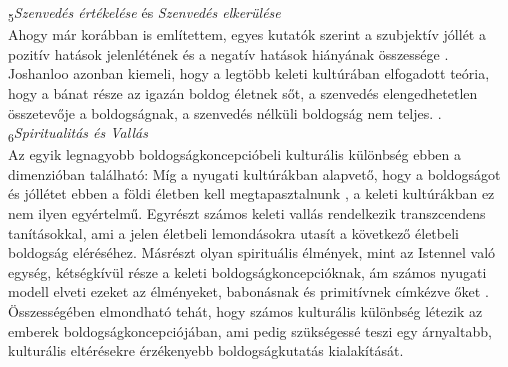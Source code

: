 \textsubscript{5}\textit{Szenvedés értékelése} és \textit{Szenvedés elkerülése}\\
Ahogy már korábban is említettem, egyes kutatók szerint a szubjektív jóllét a pozitív hatások jelenlétének és a negatív hatások hiányának összessége \parencite{diener_suh_lucas_smith_1999}. Joshanloo azonban kiemeli, hogy a legtöbb keleti kultúrában elfogadott teória, hogy a bánat része az igazán boldog életnek sőt, a szenvedés elengedhetetlen összetevője a boldogságnak, a szenvedés nélküli boldogság nem teljes. \parencite{joshanloo_2013_eastern}.\\
\textsubscript{6}\textit{Spiritualitás és Vallás}\\
Az egyik legnagyobb boldogságkoncepcióbeli kulturális különbség ebben a dimenzi\-óban található: Míg a nyugati kultúrákban alapvető, hogy a boldogságot és jóllétet ebben a földi életben kell megtapasztalnunk \parencite{joshanloo_2013_eastern}, a keleti kultúrákban ez nem ilyen egyértelmű. Egyrészt számos keleti vallás rendelkezik transzcendens tanításokkal, ami a jelen életbeli lemondásokra utasít a következő életbeli boldogság eléréséhez. Másrészt olyan spirituális élmények, mint az Istennel való egység, kétség\-kívül része a keleti boldogságkoncepcióknak, ám számos nyugati modell elveti ezeket az élményeket, babonásnak és primitívnek címkézve őket \parencite{joshanloo_2013_eastern}.\\
Összességében elmondható tehát, hogy számos kulturális különbség létezik az emberek boldogságkoncepciójában, ami pedig szükségessé teszi egy árnyaltabb, kulturális eltérésekre érzékenyebb boldogságkutatás kialakítását.


